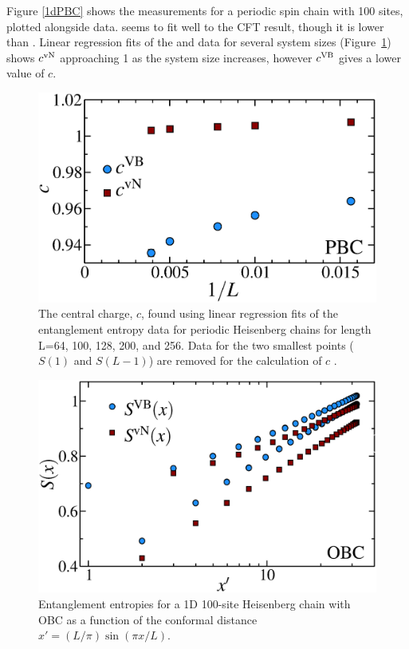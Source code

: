 Figure \ref{1dPBC} shows the \vb measurements for a periodic spin chain with 100 sites, plotted alongside \vn data.  \vb seems to fit well to the CFT result, though it is lower than \vn.
Linear regression fits of the \vb and \vn data for several system sizes (Figure~\ref{c1}) shows $c^{\rm vN}$ approaching 1 as the system size increases, however $c^{\rm VB}$ gives a lower value of $c$.


\begin{figure} {
\includegraphics[width=6in]{./figures/paper1/figure1/thesis_c1.eps} 
	\centering
	\caption[1D Results for VB EE and von Neumann EE]{
	The central charge, $c$, found using linear regression fits of the entanglement entropy data 	for periodic Heisenberg chains for length L=64, 100, 128, 200, and 256.  Data for the two smallest 	points ($S(1)$ and $S(L-1)$) are removed for the calculation of $c$ .
	\label{c1}}
} 
\end{figure}


\begin{figure} {
	\includegraphics[width=5.5in]{./figures/paper1/figure1/thesis_obc.eps} 
	\centering
	\caption[1D OBC Results for VB EE and von Neumann EE]{
	Entanglement entropies for a 1D 100-site Heisenberg chain with OBC as a function of the conformal distance $x'  = (L/\pi)\sin (\pi x/L)$.
	\label{1dOBC}}}
\end{figure}

